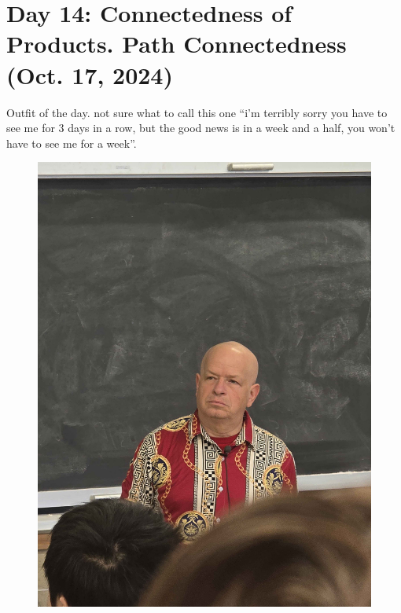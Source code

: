\section{Day 14: Connectedness of Products. Path Connectedness (Oct. 17, 2024)}
Outfit of the day. not sure what to call this one ``i'm terribly sorry you have to see me for $3$ days in a row, but the good news is in a week and a half, you won't have to see me for a week''.
\begin{figure}[h]
    \centering
    \includegraphics[scale=0.1]{MAT327 Notes/Dror Shirts/dror day 14 shirt.jpg}
\end{figure}

